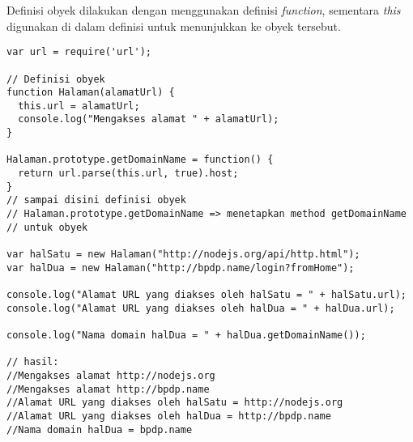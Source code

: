 Definisi obyek dilakukan dengan menggunakan definisi \textit{function}, sementara \textit{this} digunakan di dalam definisi untuk menunjukkan ke obyek tersebut. 

\lstset{language=JavaScript,caption=Definisi obyek di JavaScript}
\begin{lstlisting}
var url = require('url');

// Definisi obyek
function Halaman(alamatUrl) {
  this.url = alamatUrl;
  console.log("Mengakses alamat " + alamatUrl);
}

Halaman.prototype.getDomainName = function() {
  return url.parse(this.url, true).host; 
}
// sampai disini definisi obyek
// Halaman.prototype.getDomainName => menetapkan method getDomainName
// untuk obyek

var halSatu = new Halaman("http://nodejs.org/api/http.html");
var halDua = new Halaman("http://bpdp.name/login?fromHome");

console.log("Alamat URL yang diakses oleh halSatu = " + halSatu.url);
console.log("Alamat URL yang diakses oleh halDua = " + halDua.url);

console.log("Nama domain halDua = " + halDua.getDomainName());

// hasil:
//Mengakses alamat http://nodejs.org
//Mengakses alamat http://bpdp.name
//Alamat URL yang diakses oleh halSatu = http://nodejs.org
//Alamat URL yang diakses oleh halDua = http://bpdp.name
//Nama domain halDua = bpdp.name
\end{lstlisting}
